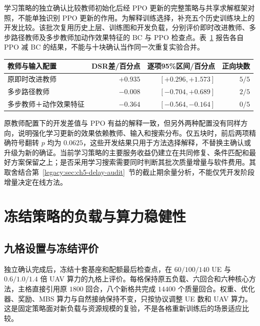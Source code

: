 学习策略的独立确认比较教师初始化后经 PPO 更新的完整策略与共享求解框架对照，不能单独识别 PPO 更新的作用。为解释训练选择，补充五个历史训练块上的开发比较。该批次复用历史上层、训练图和开发负载，分别评价即时改进教师、多步路径教师及多步教师加动作效果特征的 BC 与 PPO 检查点。表~\ref{legacy:tab:ch5-bc-ppo-development} 报告各自 PPO 减 BC 的结果，不能与十块确认当作同一次重复实验合并。

\begin{table}[!htbp]
 \centering
 \label{legacy:tab:ch5-bc-ppo-development}
 \small
 \begin{tabular}{lrrr}
  \toprule
  教师与输入配置 & DSR差/百分点 & 逐项95\%区间/百分点 & 正向块数 \\
  \midrule
  原即时改进教师 & $+0.935$ & $[+0.296,+1.573]$ & $5/5$ \\
  多步路径教师 & $-0.008$ & $[-0.704,+0.689]$ & $2/5$ \\
  多步教师＋动作效果特征 & $-0.364$ & $[-0.564,-0.164]$ & $0/5$ \\
  \bottomrule
 \end{tabular}
\end{table}

原教师配置下的开发差值与 PPO 有益的解释一致，但另外两种配置没有同样方向，说明强化学习更新的效果依赖教师、输入和搜索分布。仅五块时，前后两项精确符号翻转 $p$ 均为 $0.0625$，这些开发结果只用于方法选择解释，不替换主确认或升级为新的确证。当前学习策略的主要服务收益仍建立在共同修复、条件匹配和最好方案保留之上；是否采用学习搜索需要同时判断其批次质量增量与软件费用。其取舍结合第~\ref{legacy:sec:ch5-delay-audit}~节的截止期余量分析，不能仅凭开发阶段增量决定在线方法。

\section{冻结策略的负载与算力稳健性}
\label{legacy:sec:ch5-robustness}

\subsection{九格设置与冻结评价}

独立确认完成后，冻结十套基座和配额最后检查点，在 $60/100/140$ UE 与 $0.6/1.0/1.4$ 倍 UAV 算力的九格上评价。每格保持原五负载、六回合和六种核心方法，主格直接引用原 $1800$ 回合，八个新格共完成 $14400$ 个质量回合。权重、优化器、奖励、MBS 算力与自然接纳保持不变，只按协议调整 UE 数和 UAV 算力。这是固定策略面对新负载与资源规模的复验，不是各格重新训练后的场景适应比较。

